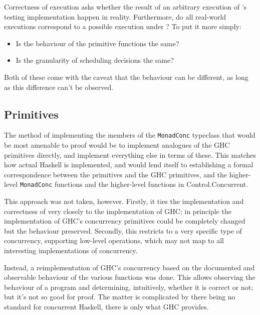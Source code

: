 Correctness of execution asks whether the result of an arbitrary
execution of \dejafu{}'s testing implementation happen in reality.
Furthermore, do all real-world executions correspond to a possible
execution under \dejafu{}? To put it more simply:

\begin{itemize}
\item Is the behaviour of the primitive functions the same?

\item Is the granularity of scheduling decisions the same?
\end{itemize}

Both of these come with the caveat that the behaviour can be
different, as long as this difference can't be observed.

\subsection{Primitives}
\label{sec:correctness-execution-primops}

The method of implementing the members of the \verb|MonadConc|
typeclass that would be most amenable to proof would be to implement
analogues of the GHC primitives directly, and implement everything
else in terms of these. This matches how actual Haskell is
implemented, and would lend itself to establishing a formal
correspondence between the \dejafu{} primitives and the GHC
primitives, and the higher-level \verb|MonadConc| functions and the
higher-level functions in Control.\-Concurrent.

This approach was not taken, however. Firstly, it ties the
implementation and correctness of \dejafu{} very closely to the
implementation of GHC; in principle the implementation of GHC's
concurrency primitives could be completely changed but the behaviour
preserved. Secondly, this restricts \dejafu{} to a very specific type
of concurrency, supporting low-level operations, which may not map to
all interesting implementations of concurrency.

Instead, a reimplementation of GHC's concurrency based on the
documented and observable behaviour of the various functions was
done. This allows observing the behaviour of a program and
determining, intuitively, whether it is correct or not; but it's not
so good for proof. The matter is complicated by there being no
standard for concurrent Haskell, there is only what GHC provides.

